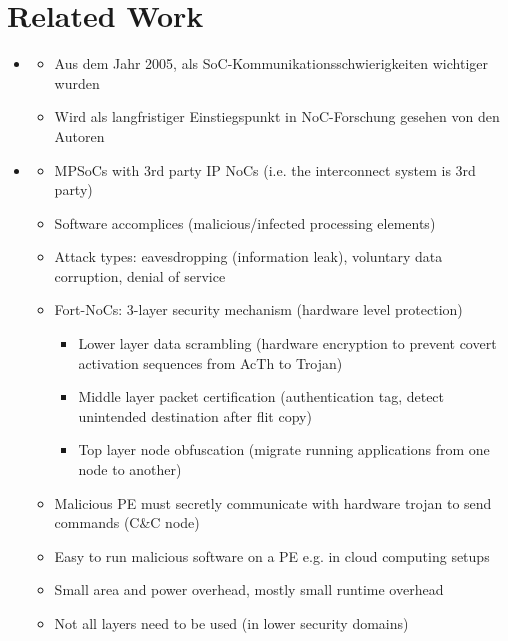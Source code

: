 \documentclass[
	paper=a4,
	fontsize=11pt,
	parskip=full %
]{scrreprt}
\begin{document}
    \chapter{Related Work} %
    \begin{itemize}
        \item \textbf{}
            \begin{itemize}
                \item Aus dem Jahr 2005, als SoC-Kommunikationsschwierigkeiten wichtiger wurden
                \item Wird als langfristiger Einstiegspunkt in NoC-Forschung gesehen von den Autoren
            \end{itemize}
        \item \textbf{}
            \begin{itemize}
                \item MPSoCs with 3rd party IP NoCs (i.e. the interconnect system is 3rd party)
                \item Software accomplices (malicious/infected processing elements)
                \item Attack types: eavesdropping (information leak), voluntary data corruption, denial of service
                \item Fort-NoCs: 3-layer security mechanism (hardware level protection)
                    \begin{itemize}
                        \item Lower layer data scrambling (hardware encryption to prevent covert activation sequences from AcTh to Trojan)
                        \item Middle layer packet certification (authentication tag, detect unintended destination after flit copy)
                        \item Top layer node obfuscation (migrate running applications from one node to another)
                    \end{itemize}
                \item Malicious PE must secretly communicate with hardware trojan to send commands (C\&C node)
                \item Easy to run malicious software on a PE e.g. in cloud computing setups
                \item Small area and power overhead, mostly small runtime overhead
                \item Not all layers need to be used (in lower security domains)

\end{itemize}
\end{itemize}
\end{document}
